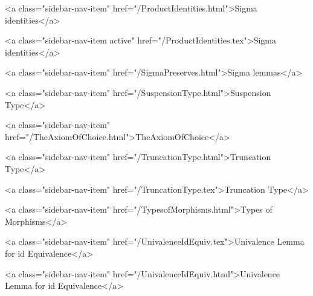      
    
      
        
          <a class="sidebar-nav-item" href="/ProductIdentities.html">Sigma identities</a>
        
      
    
      
        
          <a class="sidebar-nav-item active" href="/ProductIdentities.tex">Sigma identities</a>
        
      
    
      
        
          <a class="sidebar-nav-item" href="/SigmaPreserves.html">Sigma lemmas</a>
        
      
    
      
        
          <a class="sidebar-nav-item" href="/SuspensionType.html">Suspension Type</a>
        
      
    
      
        
          <a class="sidebar-nav-item" href="/TheAxiomOfChoice.html">TheAxiomOfChoice</a>
        
      
    
      
        
          <a class="sidebar-nav-item" href="/TruncationType.html">Truncation Type</a>
        
      
    
      
        
          <a class="sidebar-nav-item" href="/TruncationType.tex">Truncation Type</a>
        
      
    
      
        
          <a class="sidebar-nav-item" href="/TypesofMorphisms.html">Types of Morphisms</a>
        
      
    
      
        
          <a class="sidebar-nav-item" href="/UnivalenceIdEquiv.tex">Univalence Lemma for id Equivalence</a>
        
      
    
      
        
          <a class="sidebar-nav-item" href="/UnivalenceIdEquiv.html">Univalence Lemma for id Equivalence</a>
        
      
    
      
        

